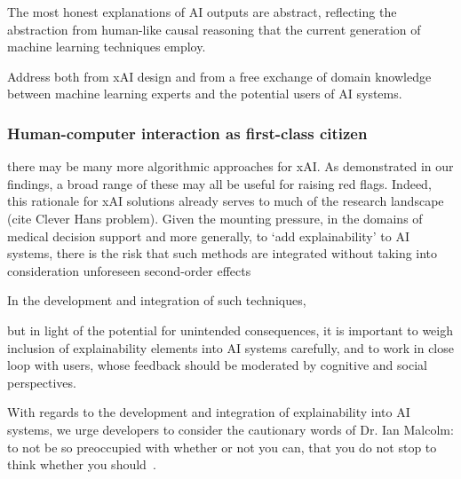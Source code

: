 The most honest explanations of AI outputs are abstract, reflecting the abstraction from human-like causal reasoning that the current generation of machine learning techniques employ.

Address both from xAI design and from a free exchange of domain knowledge between machine learning experts and the potential users of AI systems. 

\subsubsection{Human-computer interaction as first-class citizen}

there may be many more algorithmic approaches for xAI. As demonstrated in our findings, a broad range of these may all be useful for raising red flags. Indeed, this rationale for xAI solutions already serves to much of the research landscape (cite Clever Hans problem). Given the mounting pressure, in the domains of medical decision support and more generally, to `add explainability' to AI systems, there is the risk that such methods are integrated without taking into consideration unforeseen second-order effects

In the development and integration of such techniques, 

but in light of the potential for unintended consequences, it is important to weigh inclusion of explainability elements into AI systems carefully, and to work in close loop with users, whose feedback should be moderated by cognitive and social perspectives. 

With regards to the development and integration of explainability into AI systems, we urge developers to consider the cautionary words of Dr. Ian Malcolm: to not be so preoccupied with whether or not you can, that you do not stop to think whether you should~\cite{crichton1991jurassic}.


